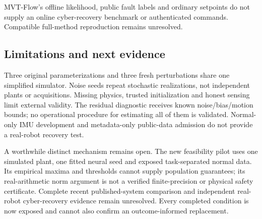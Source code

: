 MVT-Flow's offline likelihood, public fault labels and ordinary setpoints do not supply an online cyber-recovery benchmark or authenticated commands. Compatible full-method reproduction remains unresolved.

\subsection{Limitations and next evidence}
Three original parameterizations and three fresh perturbations share one simplified simulator. Noise seeds repeat stochastic realizations, not independent plants or acquisitions. Missing physics, trusted initialization and honest sensing limit external validity. The residual diagnostic receives known noise/bias/motion bounds; no operational procedure for estimating all of them is validated. Normal-only IMU development and metadata-only public-data admission do not provide a real-robot recovery test.

A worthwhile distinct mechanism remains open. The new feasibility pilot uses one simulated plant, one fitted neural seed and exposed task-separated normal data. Its empirical maxima and thresholds cannot supply population guarantees; its real-arithmetic norm argument is not a verified finite-precision or physical safety certificate. Complete recent published-system comparison and independent real-robot cyber-recovery evidence remain unresolved. Every completed condition is now exposed and cannot also confirm an outcome-informed replacement.
